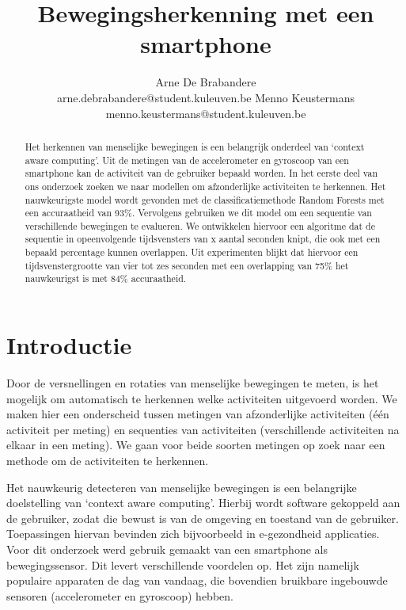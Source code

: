 \documentclass{article}
\title{Bewegingsherkenning met een smartphone}
\author{Arne De Brabandere\\
	arne.debrabandere@student.kuleuven.be
    \And
    Menno Keustermans\\
    menno.keustermans@student.kuleuven.be}
\begin{document}
\maketitle

\begin{abstract}

Het herkennen van menselijke bewegingen is een belangrijk onderdeel van `context aware computing'. Uit de metingen van de accelerometer en gyroscoop van een smartphone kan de activiteit van de gebruiker bepaald worden. In het eerste deel van ons onderzoek zoeken we naar modellen om afzonderlijke activiteiten te herkennen. Het nauwkeurigste model wordt gevonden met de classificatiemethode Random Forests met een accuraatheid van 93\%. Vervolgens gebruiken we dit model om een sequentie van verschillende bewegingen te evalueren. We ontwikkelen hiervoor een algoritme dat de sequentie in opeenvolgende tijdsvensters van x aantal seconden knipt, die ook met een bepaald percentage kunnen overlappen. Uit experimenten blijkt dat hiervoor een tijdsvenstergrootte van vier tot zes seconden met een overlapping van 75\% het nauwkeurigst is met 84\% accuraatheid.

\end{abstract}

\section{Introductie}

Door de versnellingen en rotaties van menselijke bewegingen te meten, is het mogelijk om automatisch te herkennen welke activiteiten uitgevoerd worden. We maken hier een onderscheid tussen metingen van afzonderlijke activiteiten (\'e\'en activiteit per meting) en sequenties van activiteiten (verschillende activiteiten na elkaar in een meting). We gaan voor beide soorten metingen op zoek naar een methode om de activiteiten te herkennen.

Het nauwkeurig detecteren van menselijke bewegingen is een belangrijke doelstelling van `context aware computing'. Hierbij wordt software gekoppeld aan de gebruiker, zodat die bewust is van de omgeving en toestand van de gebruiker. Toepassingen hiervan bevinden zich bijvoorbeeld in e-gezondheid applicaties. Voor dit onderzoek werd gebruik gemaakt van een smartphone als bewegingssensor. Dit levert verschillende voordelen op. Het zijn namelijk populaire apparaten de dag van vandaag, die bovendien bruikbare ingebouwde sensoren (accelerometer en gyroscoop) hebben.
\end{document}
